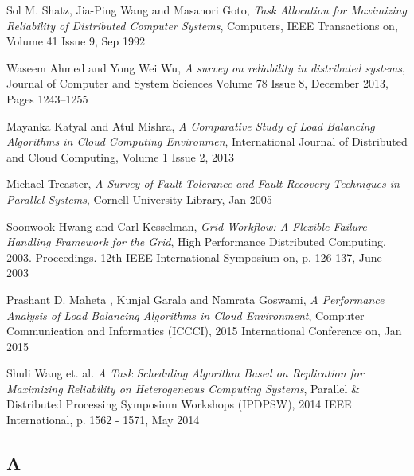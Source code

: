 \documentclass{cslthse-msc}
\begin{document}
\begin{thebibliography}{50}

	Sol M. Shatz, Jia-Ping Wang and Masanori Goto,
	\emph{Task Allocation for Maximizing Reliability of Distributed Computer Systems},
	Computers, IEEE Transactions on, Volume 41  Issue 9,
	Sep 1992
	
	Waseem Ahmed and Yong Wei Wu,
	\emph{A survey on reliability in distributed systems},
	Journal of Computer and System Sciences Volume 78 Issue 8,
	December 2013, Pages 1243–1255

	Mayanka Katyal and Atul Mishra,
	\emph{A Comparative Study of Load Balancing Algorithms in Cloud Computing Environmen},
	International Journal of Distributed and Cloud Computing, Volume 1 Issue 2,
	2013

	Michael Treaster,
	\emph{A Survey of Fault-Tolerance and Fault-Recovery Techniques in Parallel Systems},
	Cornell University Library,
	Jan 2005

	Soonwook Hwang and Carl Kesselman,
	\emph{Grid Workflow: A Flexible Failure Handling Framework for the Grid},
	High Performance Distributed Computing, 2003. Proceedings. 12th IEEE International Symposium on, p. 	126-137, 
	June 2003

	Prashant D. Maheta , Kunjal Garala and Namrata Goswami,
	\emph{A Performance Analysis of Load Balancing Algorithms in Cloud Environment},
	Computer Communication and Informatics (ICCCI), 2015 International Conference on,
	Jan 2015
	
	
	Shuli Wang et. al.
	\emph{A Task Scheduling Algorithm Based on Replication for Maximizing Reliability on Heterogeneous Computing Systems},
	Parallel \& Distributed Processing Symposium Workshops (IPDPSW), 2014 IEEE International, p. 1562 - 1571, 
	May 2014

\end{thebibliography}

\begin{appendices}
\chapter{A}

\end{appendices}
\end{document}
